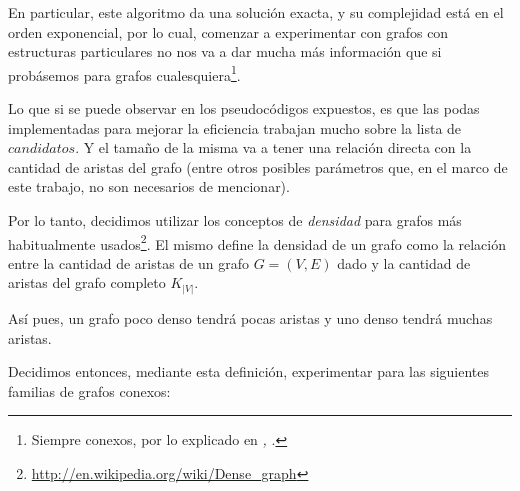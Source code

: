 \par En particular, este algoritmo da una soluci\'on exacta, y su complejidad
    est\'a en el orden exponencial, por lo cual, comenzar a experimentar
    con grafos con estructuras particulares no nos va a dar mucha m\'as informaci\'on
    que si prob\'asemos para grafos cualesquiera\footnote{Siempre conexos, por lo
    explicado en \emph{, }.}.

\par Lo que si se puede observar en los pseudoc\'odigos expuestos, es que las
    podas implementadas para mejorar la eficiencia trabajan mucho sobre la lista
    de $candidatos$. Y el tama\~no de la misma va a tener una relaci\'on directa
    con la cantidad de aristas del grafo (entre otros posibles par\'ametros que,
    en el marco de este trabajo, no son necesarios de mencionar).

\par Por lo tanto, decidimos utilizar los conceptos de \emph{densidad} para grafos
    m\'as habitualmente usados\footnote{\url{http://en.wikipedia.org/wiki/Dense_graph}}.
    El mismo define la densidad de un grafo como la relaci\'on entre la cantidad
    de aristas de un grafo $G=(V,E)$ dado y la cantidad de aristas del grafo completo
    $K_{|V|}$.

\par As\'i pues, un grafo poco denso tendr\'a pocas aristas y uno denso tendr\'a muchas
    aristas.

\par Decidimos entonces, mediante esta definici\'on, experimentar para las siguientes
    familias de grafos conexos:

